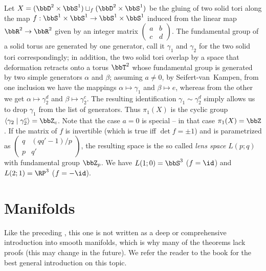 \begin{example}\label{example Lens space bredon}
    Let $X=(\bbD^2\times \bbS^1)\sqcup_f (\bbD^2\times \bbS^1)$ be the gluing of two solid tori along the map $f:\bbS^1\times \bbS^1\to \bbS^1\times \bbS^1$ induced from the linear map $\bbR^2\to\bbR^2$ given by an integer matrix $\begin{pmatrix}a&b\\c&d\end{pmatrix}$. The fundamental group of a solid torus are generated by one generator, call it $\gamma_1$ and $\gamma_2$ for the two solid tori correspondingly; in addition, the two solid tori overlap by a space that deformation retracts onto a torus $\bbT^2$ whose fundamental group is generated by two simple generators $\alpha$ and $\beta$; assuming $a\neq 0$, by Seifert-van~Kampen, from one inclusion we have the mappings $\alpha\mapsto\gamma_1$ and $\beta\mapsto e$, whereas from the other we get $\alpha\mapsto \gamma_2^d$ and $\beta\mapsto \gamma_2^c$. The resulting identification $\gamma_1\sim \gamma_2^d$ simply allows us to drop $\gamma_1$ from the list of generators. Thus $\pi_1(X)$ is the cyclic group $\langle \gamma_2\mid \gamma_2^c\rangle=\bbZ_c$. Note that the case $a=0$ is special -- in that case $\pi_1(X)=\bbZ$. If the matrix of $f$ is invertible (which is true iff $\det f=\pm1$) and is parametrized as $\begin{pmatrix}q&(qq'-1)/p\\p&q'\end{pmatrix}$, the resulting space is the so called \emph{lens space} $L(p;q)$ with fundamental group $\bbZ_p$. We have $L(1;0)=\bbS^3$ ($f=\id$) and $L(2;1)=\RP^3$ ($f=-\id$).
\end{example}





\clearpage

\chapter{Manifolds}\label{ch manifolds}

Like the preceding \chap, this one is not written as a deep or comprehensive introduction into smooth manifolds, which is why many of the theorems lack proofs (this may change in the future). We refer the reader to the book \cite{Lee} for the best general introduction on this topic.


